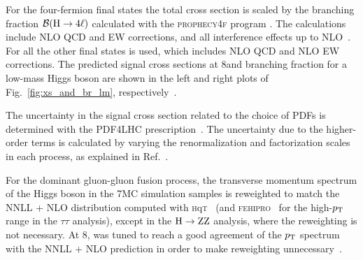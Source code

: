 \documentclass[12pt,twoside,a4paper,cmspaper,final,collab]{cms-tdr}
\begin{document}
For the four-fermion final states the total cross section is scaled by the branching fraction $\mathcal{B}(\mathrm{H}\rightarrow 4\ell)$ calculated
with the \textsc{prophecy4f} program \cite{Bredenstein:2006ha,Bredenstein:2006rh}.  The calculations include NLO QCD and EW corrections,
and all interference effects up
to NLO~\cite{LHCHiggsCrossSectionWorkingGroup:2011ti,Bredenstein:2006rh,Bredenstein:2006ha,Djouadi:1997yw,hdecay2,Actis:2008ts,Denner:2011mq,Dittmaier:2012vm}.
For all the other final states {\HDECAY} \cite{Djouadi:1997yw,hdecay2} is used, which includes NLO QCD and NLO EW corrections.
The predicted signal cross sections at 8\TeV and branching fraction for a low-mass Higgs boson are shown in the left and right plots
of Fig.~\ref{fig:xs_and_br_lm}, respectively~\cite{LHCHiggsCrossSectionWorkingGroup:2011ti,Dittmaier:2012vm}.


The uncertainty in the signal cross section related to
the choice of PDFs is determined with the PDF4LHC
prescription~\cite{Alekhin:2011sk,Botje:2011sn,Lai:2010vv,Martin:2009iq,Ball:2011mu}.
The uncertainty due to the higher-order terms
is calculated by varying the renormalization and factorization scales in each process,
as explained in Ref.~\cite{LHCHiggsCrossSectionWorkingGroup:2011ti}.


For the dominant gluon-gluon fusion process, the
transverse momentum spectrum of the Higgs boson in the 7\TeV MC simulation samples
is reweighted to match the
NNLL + NLO distribution computed
with \textsc{h}q\textsc{t}~\cite{Bozzi:2005wk,deFlorian:2011xf}
(and \textsc{fehipro}~\cite{FeHiPro1,FeHiPro2} for the high-$p_{\mathrm{T}}$ range in the $\tau\tau$ analysis),
except in the $\mathrm{H}\to\mathrm{Z}\mathrm{Z}$ analysis, where the reweighting is not necessary.
At 8\TeV,  \POWHEG was tuned to reach a good agreement of the $p_{\mathrm{T}}$ spectrum with
the NNLL + NLO prediction in order to make reweighting unnecessary~\cite{Dittmaier:2012vm}.
\end{document}
